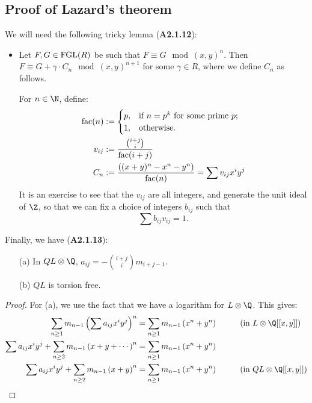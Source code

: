 \documentclass[11pt]{article}
\newcommand{\FGL}{\textup{FGL}}
\begin{document}
\begin{Formal Group Laws}
\subsection*{Proof of Lazard's theorem}
\begin{itemise}

\item We will need the following tricky lemma (\textbf{A2.1.12}):
\begin{itemize}\squishlist
\item Let $F,G\in\FGL(R)$ be such that $F\equiv G\mod{(x,y)^n}$. Then $F\equiv G+\gamma\cdot C_n\mod{(x,y)^{n+1}}$ for some $\gamma\in R$, where we define $C_n$ as follows.

\INDENT For $n\in\N$, define:
\begin{alignat*}{2}
\textup{fac}(n)&:=
\begin{cases}
p,&\textup{if }n=p^k\textup{ for some prime $p$};\\
1,&\textup{otherwise}.
\end{cases}%
\\
v_{ij}&:=
\frac{{i+j\choose i}}{\textup{fac}(i+j)}%
 \\
C_n&:=\frac{\left((x+y)^n-x^n-y^n\right)}{\textup{fac}(n)}=\sum v_{ij}x^iy^j
\end{alignat*}
It is an exercise to see that the $v_{ij}$ are all integers, and generate the unit ideal of $\Z$, so that we can fix a choice of integers $b_{ij}$ such that
\[\sum b_{ij}v_{ij}=1.\]
\end{itemize}
\item Finally, we have (\textbf{A2.1.13}):
\begin{enumerate}\squishlist
\item[(a)] In ${QL}\otimes{\Q}$, $a_{ij}=-{i+j\choose i} m_{i+j-1}$.
\item[(b)] $QL$ is torsion free.
\end{enumerate}
\begin{proof}
For (a), we use the fact that we have a logarithm for ${L}\otimes{\Q}$. This gives:
\begin{alignat*}{2}
\sum_{n\geq1}m_{n-1}\left(\sum a_{ij}x^iy^j\right)^n&=\sum_{n\geq1}m_{n-1} \left(x^n+y^n\right)&\qquad&\text{(in ${L}\otimes{\Q}[[x,y]]$)}
\\\sum a_{ij}x^iy^j+\sum_{n\geq2}m_{n-1} \left(x+y+\cdots\right)^n&=\sum_{n\geq1}m_{n-1} \left(x^n+y^n\right)
\\\sum a_{ij}x^iy^j+\sum_{n\geq2}m_{n-1} \left(x+y\right)^n&=\sum_{n\geq1}m_{n-1} \left(x^n+y^n\right)&\qquad&\text{(in ${QL}\otimes{\Q}[[x,y]]$)}

\end{alignat*}
\end{proof}
\end{itemise}
\end{Formal Group Laws}
\end{document}
